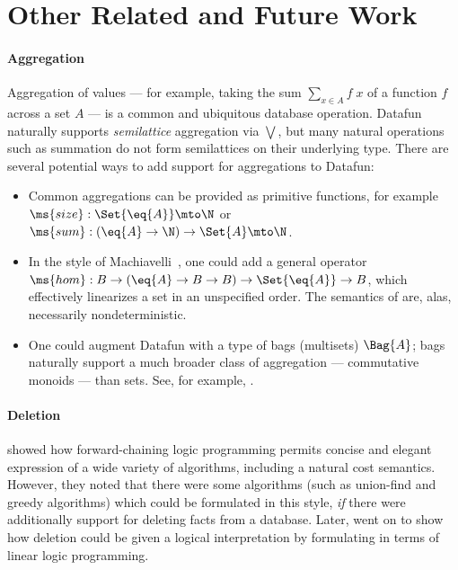 \section{Other Related and Future Work}
\label{sec:futurework}

\paragraph{Aggregation}
Aggregation of values --- for example, taking the sum $\sum_{x \in A} f \;x$ of
a function $f$ across a set $A$ --- is a common and ubiquitous database
operation. Datafun naturally supports \emph{semilattice} aggregation via
$\bigvee$, but many natural operations such as summation do not form
semilattices on their underlying type. There are several potential ways to add
support for aggregations to Datafun:
\begin{itemize}
\item Common aggregations can be provided as primitive functions, for example
  $\ms{size} : \Set{\eq{A}} \mto \N$ or $\ms{sum} : (\eq{A} \to \N) \uto \Set{A}
  \mto \N$.

\item In the style of Machiavelli~\cite{machiavelli}, one could add a general
  operator $\ms{hom} : B \to (\eq{A} \uto B \uto B) \uto \Set{\eq{A}} \uto B$,
  which effectively linearizes a set in an unspecified order. The semantics of
   are, alas, necessarily nondeterministic.

\item One could augment Datafun with a type of bags (multisets) $\Bag{A}$; bags
  naturally support a much broader class of aggregation --- commutative monoids
  --- than sets. See, for example, \citet{multilinear-bigdata}.
\end{itemize}

\paragraph{Deletion} \citet{logical-algorithms} showed how
forward-chaining logic programming permits concise and elegant
expression of a wide variety of algorithms, including a natural cost
semantics. However, they noted that there were some algorithms (such
as union-find and greedy algorithms) which could be formulated in this
style, \emph{if} there were additionally support for deleting facts
from a database. Later, \citet{linear-logical-algorithms} went on to
show how deletion could be given a logical interpretation by
formulating in terms of linear logic programming.

